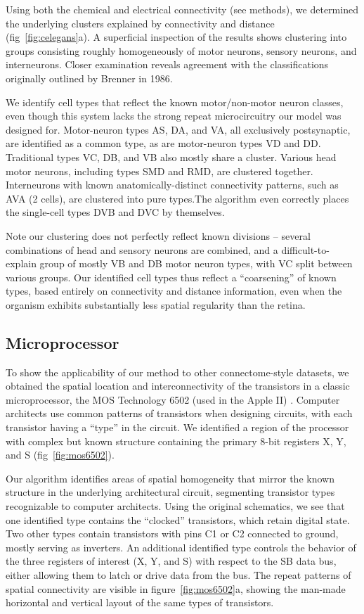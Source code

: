 \documentclass{nature}
\begin{document}
Using both the chemical and electrical connectivity (see methods), we
determined the underlying clusters explained by connectivity and
distance (fig~\ref{fig:celegans}a). A superficial inspection of the results shows
clustering into groups consisting roughly homogeneously of motor
neurons, sensory neurons, and interneurons. Closer examination reveals
agreement with the classifications originally outlined by Brenner in
1986.  

We identify cell types that reflect the known motor/non-motor neuron
classes, even though this system lacks the strong repeat
microcircuitry our model was designed for.  Motor-neuron types AS, DA,
and VA, all exclusively postsynaptic, are identified as a common type,
as are motor-neuron types VD and DD. Traditional types VC, DB, and VB
also mostly share a cluster. Various head motor neurons, including
types SMD and RMD, are clustered together. Interneurons with known
anatomically-distinct connectivity patterns, such as AVA (2 cells),
are clustered into pure types.The algorithm even correctly places the
single-cell types DVB and DVC by themselves.

Note our clustering does not perfectly reflect known divisions --
several combinations of head and sensory neurons are combined, and a
difficult-to-explain group of mostly VB and DB motor neuron types,
with VC split between various groups. Our identified cell types thus
reflect a ``coarsening'' of known types, based entirely on
connectivity and distance information, even when the organism exhibits
substantially less spatial regularity than the retina.


\subsection{Microprocessor}

To show the applicability of our method to other connectome-style
datasets, we obtained the spatial location and interconnectivity of
the transistors in a classic microprocessor, the MOS Technology 6502
(used in the Apple II) \autocite{James2010}. Computer architects use
common patterns of transistors when designing circuits, with each
transistor having a ``type'' in the circuit. We identified a region of
the processor with complex but known structure containing the primary
8-bit registers X, Y, and S (fig~\ref{fig:mos6502}).

Our algorithm identifies areas of spatial homogeneity that mirror the
known structure in the underlying architectural circuit, segmenting
transistor types recognizable to computer architects. Using the
original schematics, we see that one identified type contains the
``clocked'' transistors, which retain digital state. Two other types
contain transistors with pins C1 or C2 connected to ground, mostly
serving as inverters.  An additional identified type controls the
behavior of the three registers of interest (X, Y, and S) with respect
to the SB data bus, either allowing them to latch or drive data from
the bus. The repeat patterns of spatial connectivity are visible in
figure~\ref{fig:mos6502}a, showing the man-made horizontal and
vertical layout of the same types of transistors.
\end{document}
